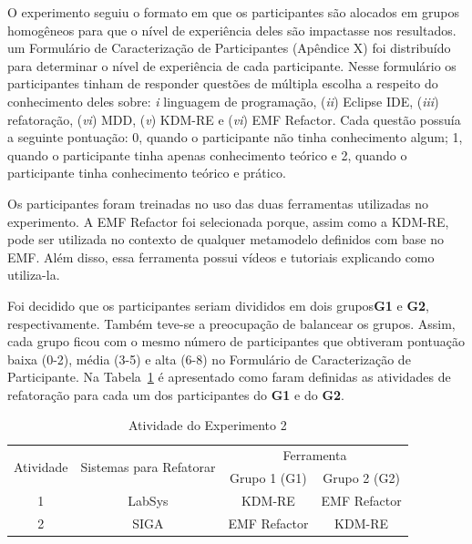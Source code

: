 O experimento seguiu o formato em que os participantes são alocados em grupos homogêneos para que o nível de experiência deles são impactasse nos resultados. um Formulário de Caracterização de Participantes (Apêndice X) foi distribuído para determinar o nível de experiência de cada participante. Nesse formulário os participantes tinham de responder questões de múltipla escolha a respeito do conhecimento deles sobre: \textit{i} linguagem de programação, (\textit{ii}) Eclipse IDE, (\textit{iii}) refatoração, (\textit{vi}) MDD, (\textit{v}) KDM-RE e (\textit{vi}) EMF Refactor. Cada questão possuía a seguinte pontuação: 0, quando o participante não tinha conhecimento algum; 1, quando o participante tinha apenas conhecimento teórico e 2, quando o participante tinha conhecimento teórico e prático.

Os participantes foram treinadas no uso das duas ferramentas utilizadas no experimento. A EMF Refactor foi selecionada porque, assim como a KDM-RE, pode ser utilizada no contexto de qualquer  metamodelo definidos com base no EMF. Além disso, essa ferramenta possui vídeos e tutoriais explicando como utiliza-la. 

Foi decidido que os participantes seriam divididos em dois grupos\textbf{G1} e \textbf{G2}, respectivamente. Também teve-se a preocupação de balancear os grupos. Assim, cada grupo ficou com o mesmo número de participantes que obtiveram pontuação baixa (0-2), média (3-5) e alta (6-8) no Formulário de Caracterização de Participante. Na Tabela~\ref{tab:agrupamento_experimento2} é apresentado como faram definidas as atividades de refatoração para cada um dos participantes do \textbf{G1} e do \textbf{G2}.


\begin{table}[h]
\centering
\caption{Atividade do Experimento 2}
\label{tab:agrupamento_experimento2}
\begin{tabular}{|c|c|c|c|}
\hline
\multirow{2}{*}{Atividade} & \multirow{2}{*}{Sistemas para Refatorar} & \multicolumn{2}{c|}{Ferramenta} \\ \cline{3-4} 
                           &                                          & Grupo 1 (G1)   & Grupo 2 (G2)   \\ \hline
1                          & LabSys                                   & KDM-RE        & EMF Refactor   \\ \hline
2                          & SIGA                                     & EMF Refactor   & KDM-RE         \\ \hline
\end{tabular}
\end{table}

